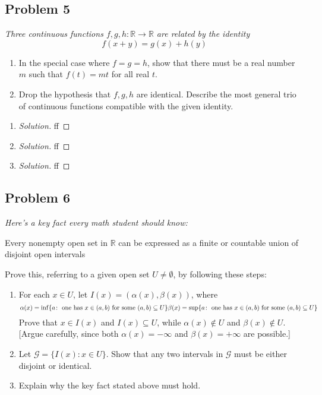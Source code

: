\documentclass{article}
\newcommand{\R}{{\mathbb R}}
\begin{document}
\subsection*{Problem 5}
{\it Three continuous functions $f,g,h \colon \R \to \R$ are related by the identity
\[
	f(x+y) = g(x) + h(y)
\]
\begin{enumerate}
	\item In the special case where $f=g=h$, show that there must
	be a real number $m$ such that $f(t) = mt$ for all real $t$.
	\item Drop the hypothesis that $f,g,h$ are identical.
	Describe the most general trio of continuous functions
	compatible with the given identity.
\end{enumerate}}

\begin{enumerate}
	\item \begin{proof}[Solution]\let\qed\relax
		ff
	\end{proof}
	\item \begin{proof}[Solution]\let\qed\relax
		ff
	\end{proof}
	\item \begin{proof}[Solution]\let\qed\relax
		ff
	\end{proof}
\end{enumerate}
\clearpage

\subsection*{Problem 6}
{\it Here's a key fact every math student should know:
\begin{center}
	Every nonempty open set in $\R$ can be expressed
	as a finite or countable union of disjoint open intervals
\end{center}
Prove this, referring to a given open set $U \neq \emptyset$, by following these steps:
\begin{enumerate}
	\item For each $x \in U$, let $I(x) = (\alpha(x),\beta(x))$, where
	\[
		\alpha(x) = \inf\{a \colon \text{ one has }x\in(a,b) \text{ for some }(a,b)\subseteq U\}\\
		\beta(x) = \sup\{a \colon \text{ one has }x\in(a,b) \text{ for some }(a,b)\subseteq U\}
	\]
	Prove that $x \in I(x)$ and $I(x) \subseteq U$,
	while $\alpha(x) \not\in U$ and $\beta(x) \not\in U$.
	[Argue carefully, since both $\alpha(x) = -\infty$ and $\beta(x) = +\infty$ are possible.]
	\item Let $\mathcal{G} = \{I(x) \colon x \in U\}$.
		Show that any two intervals in $\mathcal{G}$ must be either disjoint or identical.
	\item Explain why the key fact stated above must hold.
\end{enumerate}}
\end{document}
